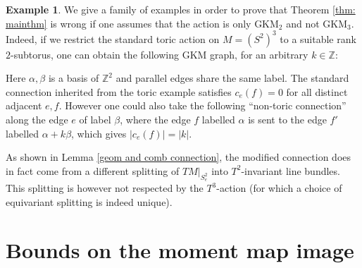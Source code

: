 \documentclass[12pt,a4paper]{amsart}
\newcommand{\ZZ}{\mathbb{Z}}
\theoremstyle{plain}
\theoremstyle{definition}
\newtheorem{ex}[thm]{Example}
\begin{document}
\begin{ex}\label{ex: weird cube}
We give a family of examples in order to prove that Theorem \ref{thm: mainthm} is wrong if one assumes that the action is only GKM$_2$ and not GKM$_3$. Indeed, if we restrict the standard toric action on $M=(S^2)^3$ to a suitable rank $2$-subtorus, one can obtain the following
GKM graph, for an arbitrary $k\in \ZZ$:
\begin{center}
\end{center}
Here $\alpha,\beta$ is a basis of $\ZZ^2$ and parallel edges share the same label. The standard connection inherited from the toric example satisfies 
$c_e(f)=0$ for all distinct adjacent $e, f$. However one could also take the following ``non-toric connection'' along the edge $e$ of label $\beta$, where the edge $f$ labelled $\alpha$ is sent to the edge $f'$ labelled $\alpha+k\beta$, which gives $|c_e(f)|=|k|$. 

As shown in Lemma \ref{geom and comb connection}, the modified connection does in fact come from a different splitting of
$TM|_{S^2_e}$ into $T^2$-invariant line bundles. This splitting is however not respected
by the $T^3$-action (for which a choice of equivariant splitting is indeed unique).
\end{ex}

\section{Bounds on the moment map image}
\label{sec: max extensions}
\end{document}

